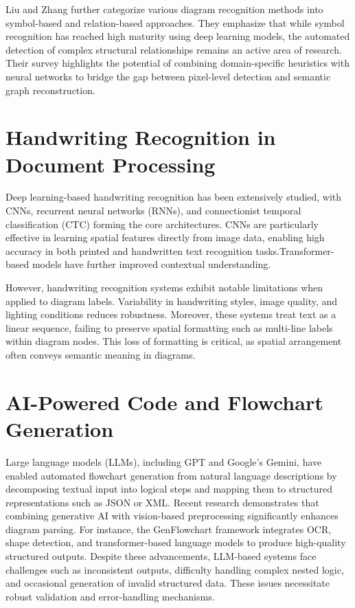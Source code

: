 Liu and Zhang further categorize various diagram recognition methods into symbol-based and relation-based approaches. They emphasize that while symbol recognition has 
reached high maturity using deep learning models, the automated 
detection of complex structural relationships remains an active 
area of research. Their survey highlights the potential of combining 
domain-specific heuristics with neural networks to bridge the gap 
between pixel-level detection and semantic graph 
reconstruction.~\cite{diagram-recognition}

\section{Handwriting Recognition in Document Processing}
\label{sec:handwriting}

Deep learning-based handwriting recognition has been extensively 
studied, with CNNs, recurrent neural networks (RNNs), and 
connectionist temporal classification (CTC) forming the core 
architectures. CNNs are particularly effective in learning spatial 
features directly from image data, enabling high accuracy in both 
printed and handwritten text recognition tasks.Transformer-based models have further improved contextual understanding.~\cite{szeliski}

However, handwriting recognition systems exhibit notable limitations 
when applied to diagram labels. Variability in handwriting styles, 
image quality, and lighting conditions reduces robustness. Moreover, 
these systems treat text as a linear sequence, failing to preserve 
spatial formatting such as multi-line labels within diagram nodes. 
This loss of formatting is critical, as spatial arrangement often 
conveys semantic meaning in diagrams.

\section{AI-Powered Code and Flowchart Generation}
\label{sec:ai-generation}

Large language models (LLMs), including GPT and Google's Gemini, 
have enabled automated flowchart generation from natural language 
descriptions by decomposing textual input into logical 
steps and mapping them to structured representations such as JSON or 
XML. Recent research demonstrates that combining generative AI with 
vision-based preprocessing significantly enhances diagram parsing. 
For instance, the GenFlowchart framework integrates OCR, shape 
detection, and transformer-based language models to produce 
high-quality structured outputs. Despite these advancements, LLM-based systems face challenges such as inconsistent outputs, difficulty handling complex nested logic, and 
occasional generation of invalid structured data. These issues 
necessitate robust validation and error-handling mechanisms.~\cite{flowchart-code}

